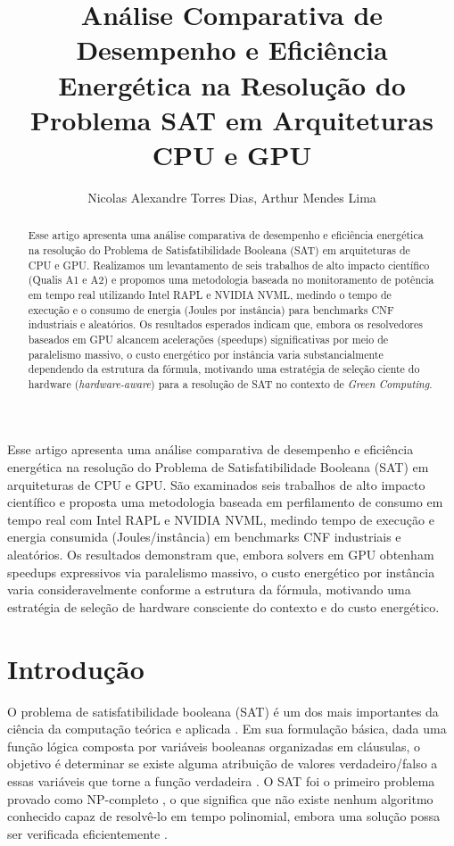 \documentclass[12pt]{article}
\title{Análise Comparativa de Desempenho e Eficiência Energética na Resolução do Problema SAT em Arquiteturas CPU e GPU}
\author{Nicolas Alexandre Torres Dias\inst{1}, Arthur Mendes Lima\inst{1}}
\begin{document}
\maketitle

\begin{abstract}
Esse artigo apresenta uma análise comparativa de desempenho e eficiência energética na resolução do Problema de Satisfatibilidade Booleana (SAT) em arquiteturas de CPU e GPU. Realizamos um levantamento de seis trabalhos de alto impacto científico (Qualis A1 e A2) e propomos uma metodologia baseada no monitoramento de potência em tempo real utilizando Intel RAPL e NVIDIA NVML, medindo o tempo de execução e o consumo de energia (Joules por instância) para benchmarks CNF industriais e aleatórios. Os resultados esperados indicam que, embora os resolvedores baseados em GPU alcancem acelerações (speedups) significativas por meio de paralelismo massivo, o custo energético por instância varia substancialmente dependendo da estrutura da fórmula, motivando uma estratégia de seleção ciente do hardware (\textit{hardware-aware}) para a resolução de SAT no contexto de \textit{Green Computing}.
\end{abstract}

\begin{resumo}
Esse artigo apresenta uma análise comparativa de desempenho e eficiência energética na resolução do Problema de Satisfatibilidade Booleana (SAT) em arquiteturas de CPU e GPU. São examinados seis trabalhos de alto impacto científico e proposta uma metodologia baseada em perfilamento de consumo em tempo real com Intel RAPL e NVIDIA NVML, medindo tempo de execução e energia consumida (Joules/instância) em benchmarks CNF industriais e aleatórios. Os resultados demonstram que, embora solvers em GPU obtenham speedups expressivos via paralelismo massivo, o custo energético por instância varia consideravelmente conforme a estrutura da fórmula, motivando uma estratégia de seleção de hardware consciente do contexto e do custo energético.
\end{resumo}

\section{Introdução}

O problema de satisfatibilidade booleana (SAT) é um dos mais importantes da ciência da computação teórica e aplicada \cite{biere:2009}. Em sua formulação básica, dada uma função lógica composta por variáveis booleanas organizadas em cláusulas, o objetivo é determinar se existe alguma atribuição de valores verdadeiro/falso a essas variáveis que torne a função verdadeira \cite{arora:2009}. O SAT foi o primeiro problema provado como NP-completo \cite{cook:1971}, o que significa que não existe nenhum algoritmo conhecido capaz de resolvê-lo em tempo polinomial, embora uma solução possa ser verificada eficientemente \cite{garey:1979}.
\end{document}
